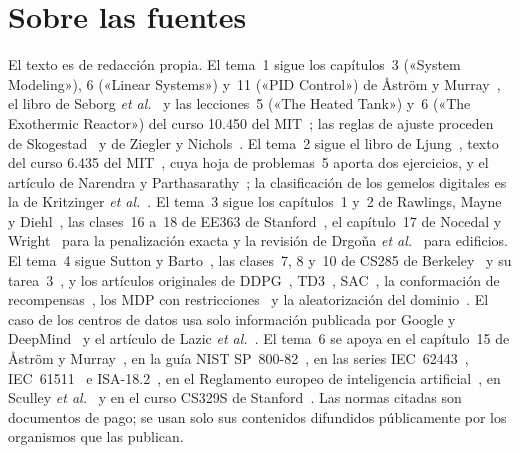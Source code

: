 \documentclass[11pt,a4paper,twoside,openany]{book}
\begin{document}
\section*{Sobre las fuentes}
El texto es de redacción propia. El tema~1 sigue los capítulos~3 («System Modeling»), 6 («Linear Systems») y~11 («PID Control») de Åström y Murray~\cite{am}, el libro de Seborg \emph{et al.}~\cite{seborg} y las lecciones~5 («The Heated Tank») y~6 («The Exothermic Reactor») del curso 10.450 del MIT~\cite{mit10450}; las reglas de ajuste proceden de Skogestad~\cite{skogestad} y de Ziegler y Nichols~\cite{zn}. El tema~2 sigue el libro de Ljung~\cite{ljung}, texto del curso 6.435 del MIT~\cite{mit6435}, cuya hoja de problemas~5 aporta dos ejercicios, y el artículo de Narendra y Parthasarathy~\cite{narendra}; la clasificación de los gemelos digitales es la de Kritzinger \emph{et al.}~\cite{kritzinger}. El tema~3 sigue los capítulos~1 y~2 de Rawlings, Mayne y Diehl~\cite{rmd}, las clases~16 a~18 de EE363 de Stanford~\cite{ee363}, el capítulo~17 de Nocedal y Wright~\cite{nw} para la penalización exacta y la revisión de Drgoňa \emph{et al.}~\cite{drgona} para edificios. El tema~4 sigue Sutton y Barto~\cite{sb}, las clases~7, 8 y~10 de CS285 de Berkeley~\cite{cs285} y su tarea~3~\cite{cs285hw3}, y los artículos originales de DDPG~\cite{ddpg}, TD3~\cite{td3}, SAC~\cite{sac,sac2}, la conformación de recompensas~\cite{ng}, los MDP con restricciones~\cite{altman,cpo} y la aleatorización del dominio~\cite{tobin,peng}. El caso de los centros de datos usa solo información publicada por Google y DeepMind~\cite{evansgao,gamblegao} y el artículo de Lazic \emph{et al.}~\cite{lazic}. El tema~6 se apoya en el capítulo~15 de Åström y Murray~\cite{am}, en la guía NIST SP~800-82~\cite{nist}, en las series IEC~62443~\cite{iec62443}, IEC~61511~\cite{iec61511} e ISA-18.2~\cite{isa182}, en el Reglamento europeo de inteligencia artificial~\cite{aiact}, en Sculley \emph{et al.}~\cite{sculley} y en el curso CS329S de Stanford~\cite{cs329s}. Las normas citadas son documentos de pago; se usan solo sus contenidos difundidos públicamente por los organismos que las publican.
\end{document}
